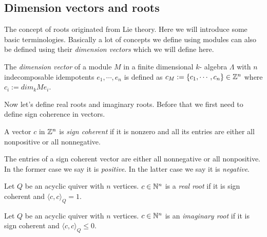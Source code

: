 \subsection{Dimension vectors and roots}
\indent The concept of roots originated from Lie theory. Here we will introduce some basic terminologies. Basically a lot of concepts we define using modules can also be defined using their \textit{dimension vectors} which we will define here.\\
\begin{definition}
The \textit{dimension vector} of a module $M$ in a finite dimensional $k$- algebra $\Lambda$ with $n$ indecomposable idempotents $e_1,\cdots, e_n$ is defined as $c_M:=\{c_1,\cdots, c_n\}\in\mathbb{Z}^n$ where $c_i:= dim_k Me_i$.
\end{definition}
\indent Now let's define real roots and imaginary roots. Before that we first need to define sign coherence in vectors.\\
\begin{definition}
A vector $c$ in $\mathbb{Z}^n$ is \textit{sign coherent} if it is nonzero and all its entries are either all nonpositive or all nonnegative.
\end{definition}
\indent The entries of a sign coherent vector are either all nonnegative or all nonpositive. In the former case we say it is \textit{positive}. In the latter case we say it is \textit{negative}.\\
\begin{definition}
Let $Q$ be an acyclic quiver with $n$ vertices. $c\in \mathbb{N}^n$ is a \textit{real root} if it is sign coherent and $\langle c, c\rangle_Q = 1$.
\end{definition}
\begin{definition}
Let $Q$ be an acyclic quiver with $n$ vertices. $c\in \mathbb{N}^n$ is an \textit{imaginary root} if it is sign coherent and $\langle c, c\rangle_Q \leq 0$.
\end{definition}
